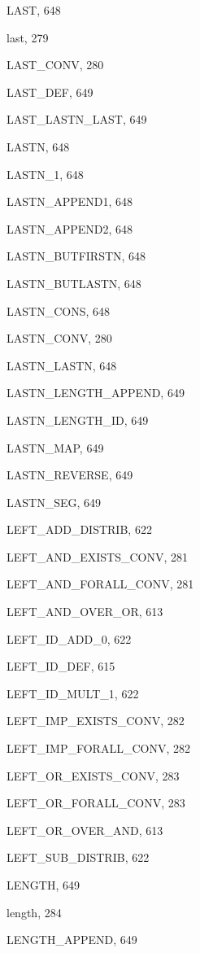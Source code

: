 \begin{theindex}
  \item {\ptt LAST}, 648
  \item {\ptt last}, 279
  \item {\ptt LAST\_CONV}, 280
  \item {\ptt LAST\_DEF}, 649
  \item {\ptt LAST\_LASTN\_LAST}, 649
  \item {\ptt LASTN}, 648
  \item {\ptt LASTN\_1}, 648
  \item {\ptt LASTN\_APPEND1}, 648
  \item {\ptt LASTN\_APPEND2}, 648
  \item {\ptt LASTN\_BUTFIRSTN}, 648
  \item {\ptt LASTN\_BUTLASTN}, 648
  \item {\ptt LASTN\_CONS}, 648
  \item {\ptt LASTN\_CONV}, 280
  \item {\ptt LASTN\_LASTN}, 648
  \item {\ptt LASTN\_LENGTH\_APPEND}, 649
  \item {\ptt LASTN\_LENGTH\_ID}, 649
  \item {\ptt LASTN\_MAP}, 649
  \item {\ptt LASTN\_REVERSE}, 649
  \item {\ptt LASTN\_SEG}, 649
  \item {\ptt LEFT\_ADD\_DISTRIB}, 622
  \item {\ptt LEFT\_AND\_EXISTS\_CONV}, 281
  \item {\ptt LEFT\_AND\_FORALL\_CONV}, 281
  \item {\ptt LEFT\_AND\_OVER\_OR}, 613
  \item {\ptt LEFT\_ID\_ADD\_0}, 622
  \item {\ptt LEFT\_ID\_DEF}, 615
  \item {\ptt LEFT\_ID\_MULT\_1}, 622
  \item {\ptt LEFT\_IMP\_EXISTS\_CONV}, 282
  \item {\ptt LEFT\_IMP\_FORALL\_CONV}, 282
  \item {\ptt LEFT\_OR\_EXISTS\_CONV}, 283
  \item {\ptt LEFT\_OR\_FORALL\_CONV}, 283
  \item {\ptt LEFT\_OR\_OVER\_AND}, 613
  \item {\ptt LEFT\_SUB\_DISTRIB}, 622
  \item {\ptt LENGTH}, 649
  \item {\ptt length}, 284
  \item {\ptt LENGTH\_APPEND}, 649

\end{theindex}
